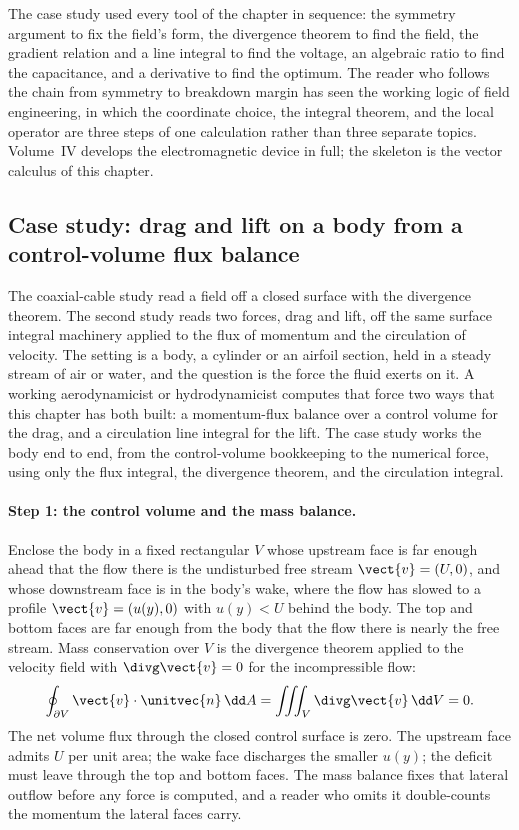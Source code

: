 The case study used every tool of the chapter in sequence: the
symmetry argument to fix the field's form, the divergence theorem to
find the field, the gradient relation and a line integral to find the
voltage, an algebraic ratio to find the capacitance, and a derivative
to find the optimum. The reader who follows the chain from symmetry to
breakdown margin has seen the working logic of field engineering, in
which the coordinate choice, the integral theorem, and the local
operator are three steps of one calculation rather than three separate
topics. Volume~IV develops the electromagnetic device in full; the
skeleton is the vector calculus of this chapter.

\subsection{Case study: drag and lift on a body from a control-volume
flux balance}

The coaxial-cable study read a field off a closed surface with the
divergence theorem. The second study reads two forces, drag and lift,
off the same surface integral machinery applied to the flux of
momentum and the circulation of velocity. The setting is a body, a
cylinder or an airfoil section, held in a steady stream of air or
water, and the question is the force the fluid exerts on it. A working
aerodynamicist or hydrodynamicist computes that force two ways that
this chapter has both built: a momentum-flux balance over a control
volume for the drag, and a circulation line integral for the lift.
The case study works the body end to end, from the control-volume
bookkeeping to the numerical force, using only the flux integral, the
divergence theorem, and the circulation integral.

\paragraph{Step 1: the control volume and the mass balance.}
Enclose the body in a fixed rectangular  $V$
whose upstream face is far enough ahead that the flow there is the
undisturbed free stream $\vect{v} = (U, 0)$, and whose downstream face
is in the body's wake, where the flow has slowed to a profile
$\vect{v} = (u(y), 0)$ with $u(y) < U$ behind the body. The top and
bottom faces are far enough from the body that the flow there is
nearly the free stream. Mass conservation over $V$ is the divergence
theorem applied to the velocity field with $\divg\vect{v} = 0$ for the
incompressible flow:
\[
\oint_{\partial V}\vect{v}\cdot\unitvec{n}\,\dd A = \iiint_{V}
\divg\vect{v}\,\dd V = 0.
\]
The net volume flux through the closed control surface is zero. The
upstream face admits $U$ per unit area; the wake face discharges the
smaller $u(y)$; the deficit must leave through the top and bottom
faces. The mass balance fixes that lateral outflow before any force is
computed, and a reader who omits it double-counts the momentum the
lateral faces carry.

